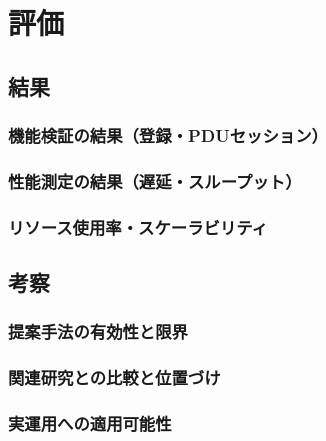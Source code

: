 \chapter{評価}
\label{chap:evaluation}

\section{結果}
\subsection{機能検証の結果（登録・PDUセッション）}
\subsection{性能測定の結果（遅延・スループット）}
\subsection{リソース使用率・スケーラビリティ}

\section{考察}
\subsection{提案手法の有効性と限界}
\subsection{関連研究との比較と位置づけ}
\subsection{実運用への適用可能性}
